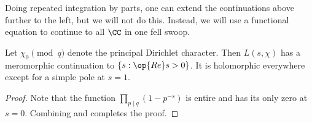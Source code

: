 \documentclass[../notes.tex]{subfiles}
\begin{document}
\begin{remark}
	Doing repeated integration by parts, one can extend the continuations above further to the left, but we will not do this. Instead, we will use a functional equation to continue to all $\CC$ in one fell swoop.
\end{remark}
\begin{corollary} \label{cor:continue-principal-char}
	Let $\chi_0\pmod q$ denote the principal Dirichlet character. Then $L(s,\chi)$ has a meromorphic continuation to $\{s:\op{Re}s>0\}$. It is holomorphic everywhere except for a simple pole at $s=1$.
\end{corollary}
\begin{proof}
	Note that the function $\prod_{p\mid q}\left(1-p^{-s}\right)$ is entire and has its only zero at $s=0$. Combining  and  completes the proof.
\end{proof}

\end{document}
